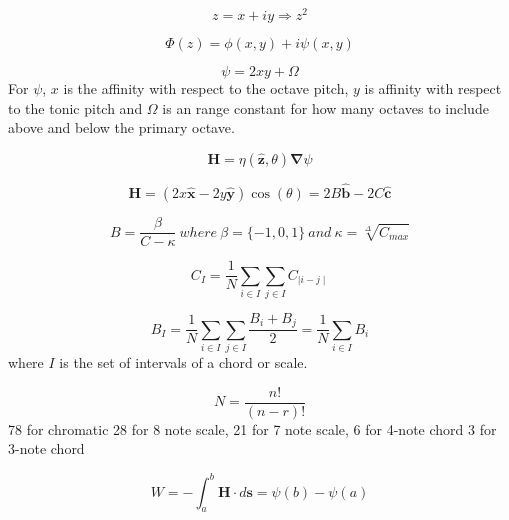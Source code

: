 \documentclass[sn-mathphys]{sn-jnl}%
\begin{document}
\begin{equation}
  z = x + iy \Rightarrow z^2
\end{equation}

\begin{equation}
  \Phi(z) = \phi(x,y) + i \psi(x,y)
\end{equation}

\begin{equation}
  \psi=2xy + \Omega
\end{equation}
For $\psi$, $x$ is the affinity with respect to the octave pitch, $y$ is affinity with respect to the tonic pitch and $\Omega$ is an range constant for how many octaves to include above and below the primary octave.

\begin{equation}
  \boldsymbol{H}=\eta(\boldsymbol{\hat{z}},\theta)\boldsymbol{\nabla}\psi \label{harmonyEq}
\end{equation}

\begin{equation}
  \boldsymbol{H}=(2x\boldsymbol{\hat{x}} - 2y\boldsymbol{\hat{y}})\cos(\theta) = 2B\boldsymbol{\hat{b}} - 2C\boldsymbol{\hat{c}} \label{consonanceEq}
\end{equation}

\begin{equation}
  B=\frac{\beta}{C-\kappa} \ where \ \beta=\{-1,0,1\}  \ and \  \kappa = \sqrt[\Delta]{C_{max}} \label{brillianceEq}
\end{equation}

\begin{equation}
  C_{I}=\frac{1}{N}\sum\limits_{i \in I}\sum\limits_{j \in I} C_{\mid i-j \mid}  \label{consonanceChordEq}
\end{equation}

\begin{equation}
  B_{I}=\frac{1}{N}\sum\limits_{i \in I}\sum\limits_{j \in I}\frac{ B_{i}+B_{j}}{2}=\frac{1}{N}\sum\limits_{i \in I}B_{i}  \label{brillianceChordEq}
\end{equation}
where $I$ is the set of intervals of a chord or scale.

\begin{equation}
  N=\frac{n!}{(n-r)!}  \label{combinationsEq}
\end{equation}
78 for chromatic
28 for 8 note scale,
21 for 7 note scale,
6 for 4-note chord
3 for 3-note chord

\begin{equation}
  W=-\int_{a}^{b}\boldsymbol{H \cdot } d\boldsymbol{s} = \psi(b) - \psi(a)    \label{cadentialGravityProofEq}
\end{equation}
\end{document}
